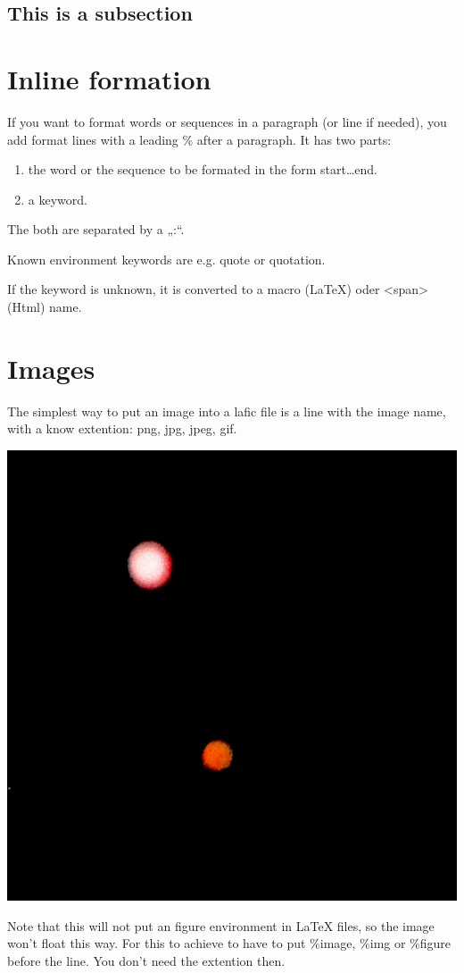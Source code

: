 \documentclass{scrartcl}
\begin{document}
\subsection{This is a subsection}

\section{Inline formation}

If you want to format words or sequences in a paragraph (or
line if needed), you add format lines with a leading \% after
a paragraph. It has two parts:

\begin{enumerate}
\item the word or the sequence to be formated in the form
start…end. 
\item a keyword.

\end{enumerate}

The both are separated by a „:“.

Known environment keywords are e.g. quote or quotation.

If the keyword is unknown, it is converted to a macro
(LaTeX) oder <span> (Html) name.

\section{Images}

The simplest way to put an image into a lafic file is a
line with the image name, with a know extention: png, jpg,
jpeg, gif.

\includegraphics[width=.50\linewidth]{Image.png}

Note that this will not put an figure environment in \LaTeX
files, so the image won't float this way. For this to
achieve to have to put \%image, \%img or \%figure before the
line. You don't need the extention then.
\end{document}
